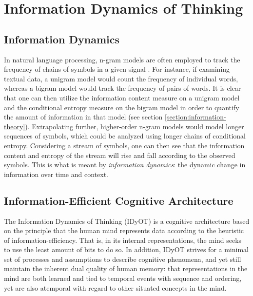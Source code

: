 \section{Information Dynamics of Thinking}
\label{section:idyot}

\subsection{Information Dynamics}
\label{section:information-dynamics}

In natural language processing, n-gram models are often employed to track the frequency of chains of symbols in a given signal \citep{sproat1996stochastic}.  For instance, if examining textual data, a unigram model would count the frequency of individual words, whereas a bigram model would track the frequency of pairs of words.  It is clear that one can then utilize the information content measure on a unigram model and the conditional entropy measure on the bigram model in order to quantify the amount of information in that model (see section \ref{section:information-theory}). Extrapolating further, higher-order n-gram models would model longer sequences of symbols, which could be analyzed using longer chains of conditional entropy.  Considering a stream of symbols, one can then see that the information content and entropy of the stream will rise and fall according to the observed symbols.  This is what is meant by \textit{information dynamics}: the dynamic change in information over time and context.

\subsection{Information-Efficient Cognitive Architecture}
\label{section:information-efficient-cognitive-architecture}

The Information Dynamics of Thinking \citep{wiggins2018creativity} (IDyOT) is a cognitive architecture based on the principle that the human mind represents data according to the heuristic of information-efficiency.  That is, in its internal representations, the mind seeks to use the least amount of bits to do so.  In addition, IDyOT strives for a minimal set of processes and assumptions to describe cognitive phenomena, and yet still maintain the inherent dual quality of human memory: that representations in the mind are both learned and tied to temporal events with sequence and ordering, yet are also atemporal with regard to other situated concepts in the mind.

